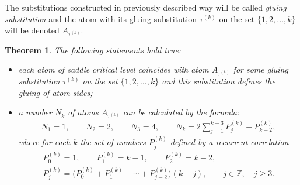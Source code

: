 \documentclass[10pt,a4paper]{amsart}
\numberwithin{equation}{section}
\newtheorem{Theorem}{Theorem}[section]
\begin{document}
The substitutions constructed in previously described way will be called \emph{gluing substitution} and the atom with its gluing substitution ${\tau^{(k)}}$ on the set $\{1,2,\ldots,k\}$ will be denoted $A_{\tau^{(k)}}$.

\begin{Theorem}\label{theorem3.1}
The following statements hold true:
\begin{itemize}\itemsep=0pt
\item[$1)$] each atom of saddle critical level coincides with atom $A_{\tau^{(k)}}$ for some gluing substitution $\tau^{(k)}$ on the set $\{1,2,\ldots,k\}$ and this substitution defines the gluing of atom sides;
\item[$2)$] a number $N_{k}$ of atoms $A_{\tau^{(k)}}$ can be calculated by the formula:
\begin{gather*}
N_{1}=1, \qquad N_{2}=2, \qquad N_{3}=4, \qquad N_{k}=2\sum_{j=1}^{k-3}P_{j}^{(k)}+P_{k-2}^{(k)},
\end{gather*}
where for each $k$ the set of numbers $P_{j}^{(k)}$ defined by a recurrent correlation
\begin{gather*}
P_{0}^{(k)}=1, \qquad P_{1}^{(k)}=k-1, \qquad P_{2}^{(k)}=k-2, \\
P_{j}^{(k)}=\big(P_{0}^{(k)}+P_{1}^{(k)}+\cdots+P_{j-2}^{(k)}\big)(k-j), \qquad j\in {\mathbb Z}, \quad j\geq3.
\end{gather*}
\end{itemize}
\end{Theorem}
\end{document}
